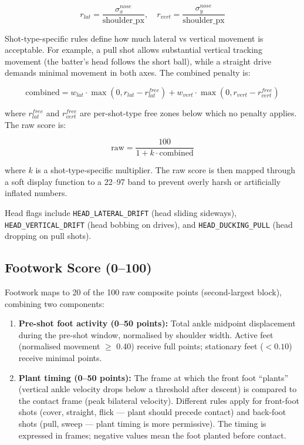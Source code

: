 \begin{justify}
\begin{equation}
    r_{lat} = \frac{\sigma_x^{nose}}{\text{shoulder\_px}}, \quad r_{vert} = \frac{\sigma_y^{nose}}{\text{shoulder\_px}}
\end{equation}

\par Shot-type-specific rules define how much lateral vs vertical movement is acceptable. For example, a pull shot allows substantial vertical tracking movement (the batter's head follows the short ball), while a straight drive demands minimal movement in both axes. The combined penalty is:

\begin{equation}
    \text{combined} = w_{lat} \cdot \max(0, r_{lat} - r_{lat}^{free}) + w_{vert} \cdot \max(0, r_{vert} - r_{vert}^{free})
\end{equation}

where $r_{lat}^{free}$ and $r_{vert}^{free}$ are per-shot-type free zones below which no penalty applies. The raw score is:

\begin{equation}
    \text{raw} = \frac{100}{1 + k \cdot \text{combined}}
\end{equation}

where $k$ is a shot-type-specific multiplier. The raw score is then mapped through a soft display function to a 22--97 band to prevent overly harsh or artificially inflated numbers.

\par Head flags include \texttt{HEAD\_LATERAL\_DRIFT} (head sliding sideways), \texttt{HEAD\_VERTICAL\_DRIFT} (head bobbing on drives), and \texttt{HEAD\_DUCKING\_PULL} (head dropping on pull shots).

\subsection{Footwork Score (0--100)}

\par Footwork maps to 20 of the 100 raw composite points (second-largest block), combining two components:

\begin{enumerate}
    \item \textbf{Pre-shot foot activity (0--50 points):} Total ankle midpoint displacement during the pre-shot window, normalised by shoulder width. Active feet (normalised movement $\geq$ 0.40) receive full points; stationary feet ($< 0.10$) receive minimal points.
    \item \textbf{Plant timing (0--50 points):} The frame at which the front foot ``plants'' (vertical ankle velocity drops below a threshold after descent) is compared to the contact frame (peak bilateral velocity). Different rules apply for front-foot shots (cover, straight, flick — plant should precede contact) and back-foot shots (pull, sweep — plant timing is more permissive). The timing is expressed in frames; negative values mean the foot planted before contact.
\end{enumerate}


\end{justify}
